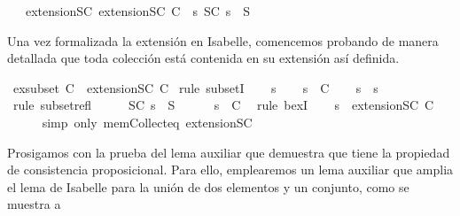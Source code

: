 \begin{isabellebody}
\ \ \ extensionSC{\isacharcolon}\ {\isachardoublequoteopen}extensionSC\ C\ {\isacharequal}\ {\isacharbraceleft}s{\isachardot}\ {\isasymexists}S{\isasymin}C{\isachardot}\ s\ {\isasymsubseteq}\ S{\isacharbraceright}{\isachardoublequoteclose}%
\begin{isamarkuptext}%
Una vez formalizada la extensión en Isabelle, comencemos probando de manera detallada que toda
  colección está contenida en su extensión así definida.%
\end{isamarkuptext}\isamarkuptrue%
\isamarkupfalse%
\ ex{}{\isacharunderscore}subset{\isacharcolon}\ {\isachardoublequoteopen}C\ {\isasymsubseteq}\ {\isacharparenleft}extensionSC\ C{\isacharparenright}{\isachardoublequoteclose}\isanewline
%
\isadelimproof
%
\endisadelimproof
%
\isatagproof
{}\isamarkupfalse%
\ {\isacharparenleft}rule\ subsetI{\isacharparenright}\isanewline
\ \ \isamarkupfalse%
\ s\isanewline
\ \ \isamarkupfalse%
\ {\isachardoublequoteopen}s\ {\isasymin}\ C{\isachardoublequoteclose}\isanewline
\ \ \isamarkupfalse%
\ {\isachardoublequoteopen}s\ {\isasymsubseteq}\ s{\isachardoublequoteclose}\isanewline
\ \ \ \ \isamarkupfalse%
\ {\isacharparenleft}rule\ subset{\isacharunderscore}refl{\isacharparenright}\isanewline
\ \ \isamarkupfalse%
\ \isamarkupfalse%
\ {\isachardoublequoteopen}{\isasymexists}S{\isasymin}C{\isachardot}\ s\ {\isasymsubseteq}\ S{\isachardoublequoteclose}\isanewline
\ \ \ \ \isamarkupfalse%
\ {\isacartoucheopen}s\ {\isasymin}\ C{\isacartoucheclose}\ \isamarkupfalse%
\ {\isacharparenleft}rule\ bexI{\isacharparenright}\isanewline
\ \ \isamarkupfalse%
\ {\isachardoublequoteopen}s\ {\isasymin}\ {\isacharparenleft}extensionSC\ C{\isacharparenright}{\isachardoublequoteclose}\isanewline
\ \ \ \ \isamarkupfalse%
\ {\isacharparenleft}simp\ only{\isacharcolon}\ mem{\isacharunderscore}Collect{\isacharunderscore}eq\ extensionSC{\isacharparenright}\isanewline
{}\isamarkupfalse%
%
\endisatagproof
{\isafoldproof}%
%
\isadelimproof
%
\endisadelimproof
%
\begin{isamarkuptext}%
Prosigamos con la prueba del lema auxiliar que demuestra que  tiene la propiedad
  de consistencia proposicional. Para ello, emplearemos un lema auxiliar que amplia el lema de 
  Isabelle  para la unión de dos elementos y un conjunto, como se muestra a 

\end{isamarkuptext}
\end{isabellebody}
